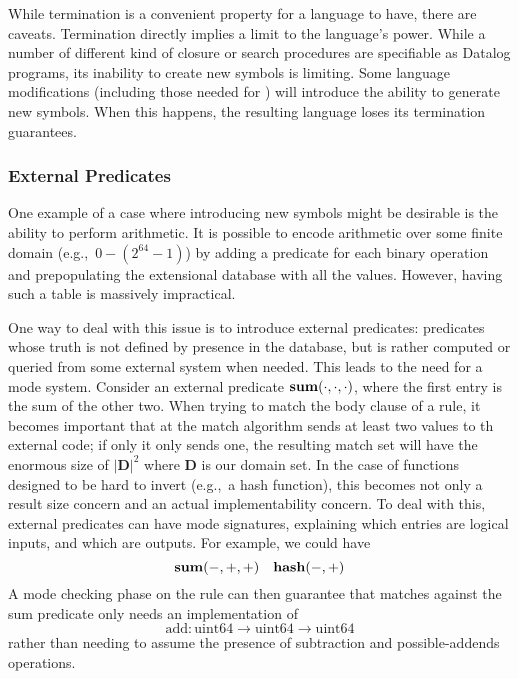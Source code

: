 While termination is a convenient property for a language to have, there are caveats.
%
Termination directly implies a limit to the language's power.
While a number of different kind of closure or search procedures are specifiable as Datalog programs, its inability to create new symbols is limiting.
%
Some language modifications (including those needed for \sysname) will introduce the ability to generate new symbols.
When this happens, the resulting language loses its termination guarantees.
\subsubsection{External Predicates}
\label{sec:extpred}
One example of a case where introducing new symbols might be desirable is the ability to perform arithmetic.
It is possible to encode arithmetic over some finite domain (e.g.,\ $0-(2^{64} - 1)$) by adding a predicate for each binary operation and prepopulating the extensional database with all the values.
However, having such a table is massively impractical.

One way to deal with this issue is to introduce external predicates: predicates whose truth is not defined by presence in the database, but is rather computed or queried from some external system when needed.
This leads to the need for a mode system.
Consider an external predicate ${\bf sum}(\cdot, \cdot, \cdot)$, where the first entry is the sum of the other two.
When trying to match the body clause of a rule, it becomes important that at the match algorithm sends at least two values to th external code; if only it only sends one, the resulting match set will have the enormous size of $|\mathbf{D}|^2$ where $\mathbf{D}$ is our domain set.
In the case of functions designed to be hard to invert (e.g.,\ a hash function), this becomes not only a result size concern and an actual implementability concern.
To deal with this, external predicates can have mode signatures, explaining which entries are logical inputs, and which are outputs. For example, we could have
\[
        {\bf sum}(-, +, +) \quad {\bf hash}(-, +)
\]
A mode checking phase on the rule can then guarantee that matches against the sum predicate only needs an implementation of
\[
        \textrm{add} : \textrm{uint64} \rightarrow \textrm{uint64} \rightarrow \textrm{uint64}
\]
rather than needing to assume the presence of subtraction and possible-addends operations.

